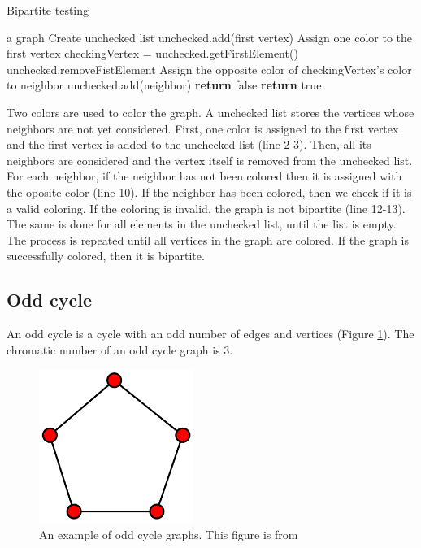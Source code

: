 \documentclass[a4paper]{report}
\begin{document}
			\begin{algorithm}
				\caption{Bipartite testing}
				\label{alg:bipartite}
			
				\begin{algorithmic}[1]
					\REQUIRE a graph
					\STATE Create unchecked list
					\STATE unchecked.add(first vertex)
					\STATE Assign one color to the first vertex
					\STATE checkingVertex = unchecked.getFirstElement()
					\STATE unchecked.removeFistElement
					\STATE Assign the opposite color of checkingVertex's color to neighbor
					\STATE unchecked.add(neighbor)
					\STATE \textbf{return} false
					\ENDIF
					\ENDFOR
					\ENDWHILE
					\ENDWHILE
					\STATE \textbf{return} true
				\end{algorithmic}
			\end{algorithm}
			 Two colors are used to color the graph. A unchecked list stores the vertices whose neighbors are not yet considered. First, one color is assigned to the first vertex and the first vertex is added to the unchecked list (line 2-3). Then, all its neighbors are considered and the vertex itself is removed from the unchecked list. For each neighbor, if the neighbor has not been colored then it is assigned with the oposite color (line 10). If the neighbor has been colored, then we check if it is a valid coloring. If the coloring is invalid, the graph is not bipartite (line 12-13). The same is done for all elements in the unchecked list, until the list is empty. The process is repeated until all vertices in the graph are colored. If the graph is successfully colored, then it is bipartite.
			\subsection{Odd cycle}
			An odd cycle is a cycle with an odd number of edges and vertices (Figure \ref{fig:oddcycle}). The chromatic number of an odd cycle graph is 3. \\
			
			\begin{figure}[h]
				\centering
				\includegraphics[width=50mm,scale=0.5]{figures/cycle.png}
				\caption{An example of odd cycle graphs. This figure is from \protect\cite{cycleFig}}
				\label{fig:oddcycle}
			\end{figure}
		
\end{document}
